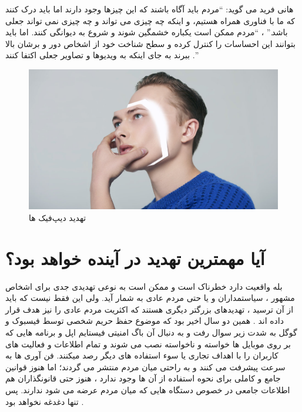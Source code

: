 \documentclass[12pt,a4paper]{report}
\begin{document}
هانی فرید می گوید: “مردم باید آگاه باشند که این چیزها وجود دارند اما باید درک کنند که ما با فناوری همراه هستیم، و اینکه چه چیزی می تواند و چه چیزی نمی تواند جعلی باشد.” ،  “مردم ممکن است یکباره خشمگین شوند و شروع به دیوانگی کنند. اما باید بتوانند این احساسات را کنترل کرده و سطح شناخت خود از اشخاص دور و برشان بالا ببرند به جای اینکه به ویدیوها و تصاویر جعلی اکتفا کنند .”\cite{asrIran}
 	
 	
 		\begin{figure}
 			\begin{center}
 					\includegraphics[width= 1 \textwidth]{images/tahdid.jpg}
 				\caption{تهدید دیپ‌فیک ها }
 				\label{tahdid}
 			\end{center}
 		\end{figure}
 
 	
\section{آیا  مهمترین تهدید در آینده خواهد بود؟}
بله واقعیت دارد  خطرناک است و ممکن است به نوعی تهدیدی جدی برای اشخاص مشهور ، سیاستمداران و یا حتی مردم عادی به شمار آید. ولی این فقط  نیست که باید از آن ترسید ، تهدیدهای بزرگتر دیگری هستند که اکثریت مردم عادی را نیز هدف قرار داده اند . همین دو سال اخیر بود که موضوع حفظ حریم شخصی توسط فیسبوک و گوگل به شدت زیر سوال رفت و به دنبال آن باگ امنیتی فیستایم اپل و برنامه هایی که بر روی موبایل ها خواسته و ناخواسته نصب می شوند و تمام اطلاعات و فعالیت های کاربران را با اهداف تجاری یا سوء استفاده های دیگر رصد میکنند. فن آوری ها به سرعت پیشرفت می کنند و به راحتی میان مردم منتشر می گردند؛ اما هنوز قوانین جامع و کاملی برای نحوه استفاده از آن ها وجود ندارد ، هنوز حتی قانونگذاران هم اطلاعات جامعی در خصوص دستگاه هایی که میان مردم عرضه می شود ندارند. پس  تنها دغدغه نخواهد بود .\cite{asrIran}
 	
\end{document}
